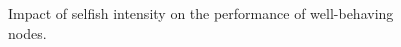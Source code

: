 \begin{figure} [ht]
    \caption{Impact of selfish intensity on the performance of
	well-behaving nodes.}
    \label{fig:throughput-loss}
\end{figure}
%


